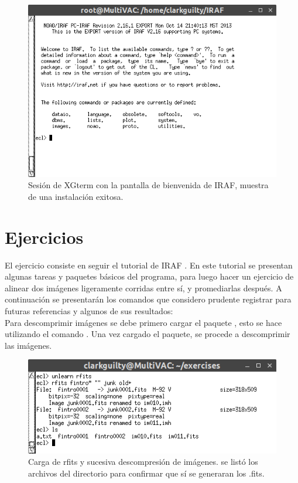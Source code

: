 \documentclass[12pt]{article}
\begin{document}
\begin{figure}[H]
  \centering
   \includegraphics[scale= 0.65]{im0.png}
  \caption{Sesión de XGterm con la pantalla de bienvenida de IRAF, muestra de una instalación exitosa.}
  \label{im0}
\end{figure}



\section{Ejercicios}
El ejercicio consiste en seguir el tutorial de IRAF . En este tutorial se presentan algunas tareas y paquetes básicos del programa, para luego hacer un ejercicio de alinear dos imágenes ligeramente corridas entre sí, y promediarlas después. A continuación se presentarán los comandos que considero prudente registrar para futuras referencias y algunos de sus resultados:\\
Para descomprimir imágenes se debe primero cargar el paquete , esto se hace utilizando el comando . Una vez cargado el paquete, se procede a descomprimir las imágenes.	

\begin{figure}[H]
  \centering
   \includegraphics[scale= 0.65]{im01.png}
  \caption{Carga de rfits y sucesiva descompresión de imágenes. se listó los archivos del directorio para confirmar que sí se generaran los .fits. }
  \label{im01}
\end{figure}
\end{document}

